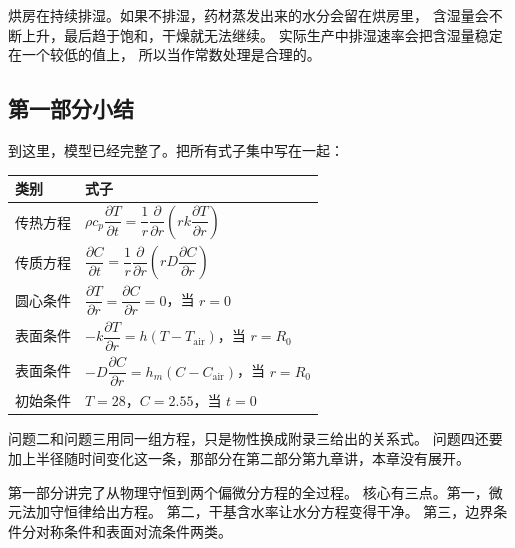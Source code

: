 烘房在持续排湿。如果不排湿，药材蒸发出来的水分会留在烘房里，
含湿量会不断上升，最后趋于饱和，干燥就无法继续。
实际生产中排湿速率会把含湿量稳定在一个较低的值上，
所以当作常数处理是合理的。

\subsection{第一部分小结}

到这里，模型已经完整了。把所有式子集中写在一起：

\begin{center}
\begin{tabular}{@{}ll@{}}
\toprule
类别 & 式子 \\
\midrule
传热方程 & $\rho c_p\dfrac{\partial T}{\partial t}=\dfrac{1}{r}\dfrac{\partial}{\partial r}\left(rk\dfrac{\partial T}{\partial r}\right)$ \\
传质方程 & $\dfrac{\partial C}{\partial t}=\dfrac{1}{r}\dfrac{\partial}{\partial r}\left(rD\dfrac{\partial C}{\partial r}\right)$ \\
圆心条件 & $\dfrac{\partial T}{\partial r}=\dfrac{\partial C}{\partial r}=0$，当 $r=0$ \\
表面条件 & $-k\dfrac{\partial T}{\partial r}=h\left(T-T_{\mathrm{air}}\right)$，当 $r=R_0$ \\
表面条件 & $-D\dfrac{\partial C}{\partial r}=h_m\left(C-C_{\mathrm{air}}\right)$，当 $r=R_0$ \\
初始条件 & $T=28$，$C=2.55$，当 $t=0$ \\
\bottomrule
\end{tabular}
\end{center}

问题二和问题三用同一组方程，只是物性换成附录三给出的关系式。
问题四还要加上半径随时间变化这一条，那部分在第二部分第九章讲，本章没有展开。

\keypoint
第一部分讲完了从物理守恒到两个偏微分方程的全过程。
核心有三点。第一，微元法加守恒律给出方程。
第二，干基含水率让水分方程变得干净。
第三，边界条件分对称条件和表面对流条件两类。
